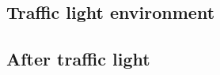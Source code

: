 \documentclass{article}
\newenvironment{soloscientifico}{}{}
\begin{document}
\subsection*{Traffic light environment}
\begin{soloscientifico}
  \lipsum[1]
\end{soloscientifico}

\subsection*{After traffic light}
\lipsum[2]
\end{document}
